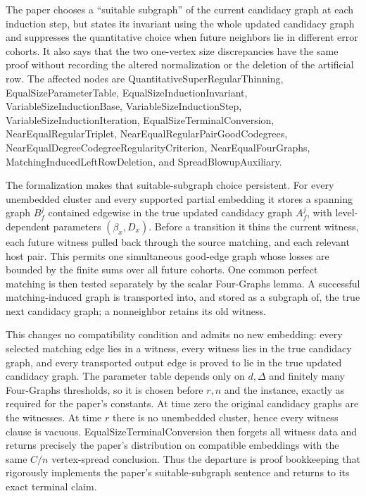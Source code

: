 The paper chooses a ``suitable subgraph'' of the current candidacy graph at each induction step, but states its invariant using the whole updated candidacy graph and suppresses the quantitative choice when future neighbors lie in different error cohorts. It also says that the two one-vertex size discrepancies have the same proof without recording the altered normalization or the deletion of the artificial row. The affected nodes are QuantitativeSuperRegularThinning, EqualSizeParameterTable, EqualSizeInductionInvariant, VariableSizeInductionBase, VariableSizeInductionStep, VariableSizeInductionIteration, EqualSizeTerminalConversion, NearEqualRegularTriplet, NearEqualRegularPairGoodCodegrees, NearEqualDegreeCodegreeRegularityCriterion, NearEqualFourGraphs, MatchingInducedLeftRowDeletion, and SpreadBlowupAuxiliary.

The formalization makes that suitable-subgraph choice persistent. For every unembedded cluster and every supported partial embedding it stores a spanning graph $B_f^j$ contained edgewise in the true updated candidacy graph $A_f^j$, with level-dependent parameters $(\beta_x,D_x)$. Before a transition it thins the current witness, each future witness pulled back through the source matching, and each relevant host pair. This permits one simultaneous good-edge graph whose losses are bounded by the finite sums over all future cohorts. One common perfect matching is then tested separately by the scalar Four-Graphs lemma. A successful matching-induced graph is transported into, and stored as a subgraph of, the true next candidacy graph; a nonneighbor retains its old witness.

This changes no compatibility condition and admits no new embedding: every selected matching edge lies in a witness, every witness lies in the true candidacy graph, and every transported output edge is proved to lie in the true updated candidacy graph. The parameter table depends only on $d,\Delta$ and finitely many Four-Graphs thresholds, so it is chosen before $r,n$ and the instance, exactly as required for the paper's constants. At time zero the original candidacy graphs are the witnesses. At time $r$ there is no unembedded cluster, hence every witness clause is vacuous. EqualSizeTerminalConversion then forgets all witness data and returns precisely the paper's distribution on compatible embeddings with the same $C/n$ vertex-spread conclusion. Thus the departure is proof bookkeeping that rigorously implements the paper's suitable-subgraph sentence and returns to its exact terminal claim.

